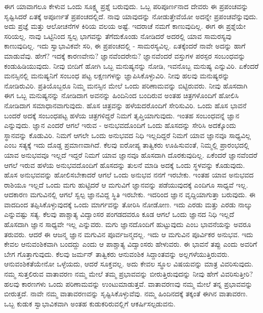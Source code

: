 ಈಗ ಯಾವಾಗಲೂ ಕೇಳುವ ಒಂದು ಸೂಕ್ಷ್ಮ ಪ್ರಶ್ನೆ ಬರುವುದು. ಒಬ್ಬ ಪರಿಪೂರ್ಣನಾದ ದೇವರು ಈ ಪ್ರಪಂಚವನ್ನು ಸೃಷ್ಟಿಸಿದರೆ ಏತಕ್ಕೆ ಅಪೂರ್ಣತೆ ಪ್ರಪಂಚದಲ್ಲಿದೆ. ನಾವು ಯಾವುದನ್ನು ನೋಡುತ್ತೇವೆಯೋ ಅದನ್ನೇ ಪ್ರಪಂಚವೆನ್ನುವುದು. ಅದು ಪ್ರಜ್ಞೆ ಮತ್ತು ಆಲೋಚನೆಗಳ ಕಿರಿಯ ವಲಯ ಅಷ್ಟೆ. ಇದರಾಚೆ ನಮಗೆ ಕಾಣುವುದಿಲ್ಲ. ಈಗ ಈ ಪ್ರಶ್ನೆಯೇ ಸರಿಯಲ್ಲ. ನಾವು ಒಟ್ಟಿನಿಂದ ಸ್ವಲ್ಪ ಭಾಗವನ್ನು ತೆಗೆದುಕೊಂಡು ನೋಡಿದರೆ ಅದರಲ್ಲಿ ಯಾವ ಸಾಮರಸ್ಯವು ಕಾಣುವುದಿಲ್ಲ. ಇದು ಸ್ವಾಭಾವಿಕವೇ ಸರಿ, ಈ ಪ್ರಪಂಚದಲ್ಲಿ - ಸಾಮರಸ್ಯವಿಲ್ಲ. ಏತಕ್ಕೆಂದರೆ ನಾವೇ ಅದನ್ನು ಹಾಗೆ ಮಾಡುವೆವು. ಹೇಗೆ? ಇದಕ್ಕೆ ಕಾರಣವೇನು? ಜ್ಞಾನವೆಂದರೇನು? ಜ್ಞಾನವೆಂದರೆ ವಸ್ತುಗಳ ಪರಸ್ಪರ ಸಂಬಂಧವನ್ನು ಕಂಡುಹಿಡಿಯುವುದು. ನೀವು ಬೀದಿಗೆ ಹೋಗಿ ಒಬ್ಬ ಮನುಷ್ಯನನ್ನು ನೋಡಿ, ಇವನೊಬ್ಬ ಮನುಷ್ಯ ಎನ್ನುವಿರಿ. ಏಕೆಂದರೆ ಮನಸ್ಸಿನಲ್ಲಿ ಮನುಷ್ಯನಿಗೆ ಸಂಬಂಧ ಪಟ್ಟ ಲಕ್ಷಣಗಳನ್ನು ಜ್ಞಾಪಿಸಿಕೊಳ್ಳುವಿರಿ. ನೀವು ಹಲವು ಮನುಷ್ಯರನ್ನು ನೋಡಿರುವಿರಿ. ಪ್ರತಿಯೊಬ್ಬರೂ ನಿಮ್ಮ ಮನಸ್ಸಿನ ಮೇಲೆ ಒಂದು ಪರಿಣಾಮವನ್ನು ಬಿಟ್ಟಿರುವರು. ನೀವು ಹೊಸದಾಗಿ ಈಗ ಒಬ್ಬ ಮನುಷ್ಯನನ್ನು ನೋಡಿದಾಗ ಅವನನ್ನು ಹಿಂದಿನಿಂದ ಬಂದಿರುವ ಅಂತಹ ಚಿತ್ರಗಳೊಂದಿಗೆ ಹೋಲಿಸಿ ನೋಡಿದಾಗ ಸಮಾಧಾನವಾಗುವುದು. ಹೊಸ ಚಿತ್ರವನ್ನು ಹಳೆಯದರೊಂದಿಗೆ ಸೇರಿಸುವಿರಿ. ಒಂದು ಹೊಸ ಭಾವನೆ ಬಂದರೆ ಅದಕ್ಕೆ ಸಂಬಂಧಪಟ್ಟ ಹಳೆಯ ಚಿತ್ರಗಳಿದ್ದರೆ ನಿಮಗೆ ತೃಪ್ತಿಯಾಗುವುದು. ಇಂತಹ ಸಂಬಂಧವನ್ನೆ ಜ್ಞಾನ ಎನ್ನುವುದು. ಜ್ಞಾನ ಎಂದರೆ ಆಗಲೆ ಇರುವ - ಅನುಭವದೊಂದಿಗೆ ಒಂದು ಹೊಸದನ್ನು ಸೇರಿಸಿ ಅದಕ್ಕೊಂದು ಸ್ಥಾನವನ್ನು ಕೊಡುವಿರಿ. ನಿಮಗೆ ಆಗಲೇ ಒಂದು ಅನುಭವದ ನಿಧಿ ಇಲ್ಲದಿದ್ದರೆ ನಿಮಗೆ ಯಾವ ಜ್ಞಾನವೂ ಸಾಧ್ಯವಿಲ್ಲ ಎಂಬ ಸತ್ಯಕ್ಕೆ ಇದು ದೊಡ್ಡ ಪ್ರಮಾಣವಾಗಿದೆ. ಕೆಲವು ಐರೋಪ್ಯ ತಾತ್ವಿಕರು ಊಹಿಸುವಂತೆ, ನಿಮ್ಮಲ್ಲಿ ಪ್ರಾರಂಭದಲ್ಲಿ ಯಾವ ಅನುಭವವೂ ಇಲ್ಲದೆ ಇದ್ದರೆ ನಿಮಗೆ ಯಾವ ಜ್ಞಾನವೂ ಹೊಸದಾಗಿ ದೊರಕುವುದಿಲ್ಲ. ಏಕೆಂದರೆ ಜ್ಞಾನವೆಂದರೆ ಆಗಲೆ ಇರುವ ಹಳೆಯ ಅನುಭವದೊಂದಿಗೆ ಹೊಸದನ್ನು ತುಲನೆ ಮಾಡಿ ಅದಕ್ಕೆ ಒಂದು ಸ್ಥಳವನ್ನು ಕೊಡುವುದು. ಹೊಸ ಅನುಭವವನ್ನು ಹೋಲಿಸಬೇಕಾದರೆ ಆಗಲೆ ಒಂದು ಅನುಭವ ನನಗೆ ಇರಬೇಕು. ಇಂತಹ ಯಾವ ಅನುಭವದ ರಾಶಿಯೂ ಇಲ್ಲದೆ ಒಂದು ಮಗು ಹುಟ್ಟಿದರೆ ಆ ಮಗುವಿಗೆ ಜ್ಞಾನವನ್ನು ಪಡೆಯುವುದಕ್ಕೆ ಎಂದಿಗೂ ಸಾಧ್ಯವೆ ಇಲ್ಲ. ಆದಕಾರಣ ಮಗುವಿನಲ್ಲಿ ಆಗಲೆ ಸ್ವಲ್ಪ ಜ್ಞಾನವಿದ್ದ ಸ್ಥಿತಿ ಇರಬೇಕು. ಇದರಿಂದ ಜ್ಞಾನ ವೃದ್ದಿಯಾಗುತ್ತಾ ಬರುವುದು. ಈ ವಾದದಿಂದ ತಪ್ಪಿಸಿಕೊಳ್ಳುವುದಕ್ಕೆ ಒಂದು ಮಾರ್ಗವನ್ನು ತೋರಿಸಿ ನೋಡೋಣ. ಇದು ಎರಡು ಮತ್ತು ಎರಡು ನಾಲ್ಕು ಎನ್ನುವಷ್ಟು ಸತ್ಯ. ಕೆಲವು ಪಾಶ್ಚಾತ್ಯ ವಿದ್ವಾಂಸರ ಪಂಗಡದವರೂ ಕೂಡ ಆಗಲೆ ಒಂದು ಜ್ಞಾನದ ನಿಧಿ ಇಲ್ಲದೆ ಹೊಸದಾಗಿ ಜ್ಞಾನ ಸಾಧ್ಯವೇ ಇಲ್ಲ ಎನ್ನುವರು. ಮಗು ಜ್ಞಾನದೊಂದಿಗೆ ಹುಟ್ಟುವುದು ಎಂಬ ಭಾವನೆಯನ್ನು ಅವರೂ ತರುವರು. ಆದರೆ ಈ ಆಜನ್ಮ ಜ್ಞಾನ ಮಗುವಿನ ಪೂರ್ವಜನ್ಮದಲ್ಲ. ಇದು ಆ ಮಗುವಿನ ಪೂರ್ವಿಕರ ಅನುಭವ. ಇದು ಕೇವಲ ಆನುವಂಶಿಕವಾಗಿ ಬಂದದ್ದು ಎಂದು ಆ ಪಾಶ್ಚಾತ್ಯ ವಿದ್ವಾಂಸರು ಹೇಳುವರು. ಈ ಭಾವನೆ ತಪ್ಪು ಎಂದು ಅವರಿಗೆ ಬೇಗ ಗೊತ್ತಾಗುವುದು. ಕೆಲವು ಜರ್ಮನ್ ತಾತ್ವಿಕರು ಆನುವಂಶಿಕ ಸಿದ್ದಾಂತವನ್ನು ಅಲ್ಲಗಳೆಯುತ್ತಿರುವರು. ಆನುವಂಶಿಕತೆಯೇನೋ ಒಳ್ಳೆಯದು, ಆದರೆ ಸೂಕ್ತವಲ್ಲ. ಅದು ಕೇವಲ ಸ್ಥೂಲ ವಿಷಯವನ್ನು ಮಾತ್ರ ವಿವರಿಸುವುದು. ನಮ್ಮ ಸುತ್ತಲಿರುವ ವಾತಾವರಣ ನಮ್ಮ ಮೇಲೆ ತಮ್ಮ ಪ್ರಭಾವವನ್ನು ಬೀರುತ್ತಿರುವುದನ್ನು ನೀವು ಹೇಗೆ ವಿವರಿಸುತ್ತೀರಿ? ಹಲವು ಕಾರಣಗಳು ಒಂದು ಪರಿಣಾಮವನ್ನು ಉಂಟುಮಾಡುತ್ತವೆ. ವಾತಾವರಣವು ನಮ್ಮ ಮೇಲೆ ತನ್ನ ಪ್ರಭಾವವನ್ನು ಬೀರುತ್ತದೆ. ನಾವೇ ನಮ್ಮ ವಾತಾವರಣವನ್ನು ಸೃಷ್ಟಿಸಿಕೊಳ್ಳುವೆವು. ನಮ್ಮ ಹಿಂದಿನದಕ್ಕೆ ತಕ್ಕಂತೆ ಈಗಿನ ವಾತಾವರಣ. ಒಬ್ಬ ಕುಡುಕ ಸ್ವಾಭಾವಿಕವಾಗಿ ಅಂತಹ ಕುಡುಕರಿರುವಲ್ಲಿಗೆ ಆಕರ್ಷಿಸಲ್ಪಡುವನು.


